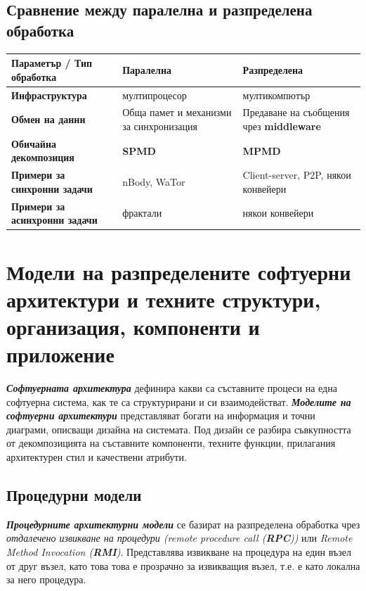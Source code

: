 \documentclass[fleqn,12pt]{article}
\begin{document}
\subsection{Сравнение между паралелна и разпределена обработка}
\begin{center}
    \begin{tabular}{ | m{60mm} | m{60mm}| m{60mm} | } 
    \hline
    \textbf{Параметър / Тип обработка} & \textbf{Паралелна} & \textbf{Разпределена} \\ 
    \hline
    \textbf{Инфраструктура} & мултипроцесор & мултикомпютър \\ 
    \hline
    \textbf{Обмен на данни} & Обща памет и механизми за синхронизация & Предаване на съобщения чрез \textbf{middleware} \\ 
    \hline
    \textbf{Обичайна декомпозиция} & \textbf{SPMD} & \textbf{MPMD} \\ 
    \hline
    \textbf{Примери за синхронни задачи} & nBody, WaTor & Client-server, P2P, някои конвейери \\ 
    \hline
    \textbf{Примери за асинхронни задачи} & фрактали & някои конвейери \\ 
    \hline
    \end{tabular}
\end{center}

\section{Модели на разпределените софтуерни архитектури и техните структури, организация, компоненти и приложение}


\textbf{\textit{Софтуерната архитектура}} дефинира какви са съставните процеси на една софтуерна система, как те са структурирани и си взаимодействат.
\textbf{\textit{Моделите на софтуерни архитектури}} представляват богати на информация и точни диаграми, описващи дизайна на системата.
Под дизайн се разбира съвкупността от декомпозицията на съставните компоненти, техните функции, прилагания архитектурен стил и качествени атрибути.

\subsection{Процедурни модели}

\textbf{\textit{Процедурните архитектурни модели}} се базират на разпределена обработка чрез \textit{отдалечено извикване на процедури (remote procedure call (\textbf{RPC}))} или \textit{Remote Method Invocation (\textbf{RMI})}.
Представлява извикване на процедура на един възел от друг възел, като това това е прозрачно за извикващия възел, т.е. е като локална за него процедура.
\end{document}
